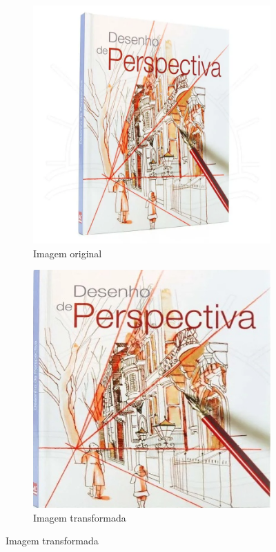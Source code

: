 \documentclass[sigconf,nonacm]{acmart}
\begin{document}
\begin{figure}[H]
  \centering
  \begin{subfigure}[b]{0.45\linewidth}
    \centering
    \includegraphics[width=\linewidth]{resources/input1.jpg}
    \caption{Imagem original}
    \label{fig:one}
  \end{subfigure}
  \hfill
  \begin{subfigure}[b]{0.45\linewidth}
    \centering
    \includegraphics[width=\linewidth]{resources/output1.jpg}
    \caption{Imagem transformada}
    \label{fig:two}
  \end{subfigure}


\end{figure}
\end{document}
